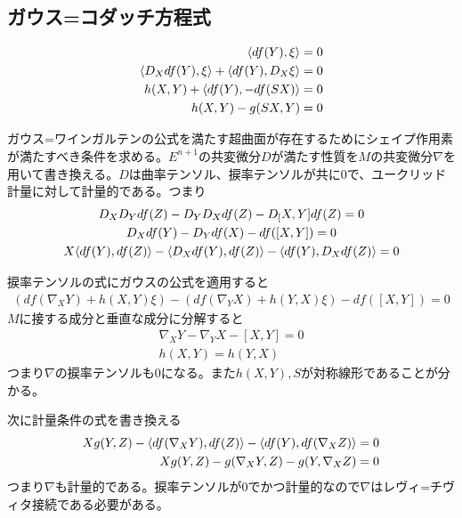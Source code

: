    \subsection{ガウス=コダッチ方程式}

        \begin{align*}
            \langle df(Y), \xi\rangle = 0\\
            \langle D_Xdf(Y), \xi\rangle + \langle df(Y), D_X\xi\rangle = 0\\
            h(X, Y) + \langle df(Y), -df(SX)\rangle = 0\\
            h(X, Y) - g(SX, Y) = 0\\
        \end{align*}

        ガウス=ワインガルテンの公式を満たす超曲面が存在するためにシェイプ作用素が満たすべき条件を求める。$E^{n+1}$の共変微分$D$が満たす性質を$M$の共変微分$\nabla$を用いて書き換える。$D$は曲率テンソル、捩率テンソルが共に0で、ユークリッド計量に対して計量的である。つまり
        \begin{gather*}
            D_XD_Ydf(Z) - D_YD_Xdf(Z) - D_[X, Y]df(Z) = 0\\
            D_Xdf(Y) - D_Ydf(X) - df([X, Y]) = 0\\
            X\langle df(Y), df(Z)\rangle - \langle D_Xdf(Y), df(Z)\rangle - \langle df(Y), D_Xdf(Z)\rangle = 0\\
        \end{gather*}

        捩率テンソルの式にガウスの公式を適用すると
        \begin{align*}
            (df(\nabla_XY) + h(X, Y)\xi) - (df(\nabla_YX) + h(Y, X)\xi) - df([X, Y]) = 0
        \end{align*}
        $M$に接する成分と垂直な成分に分解すると
        \begin{gather*}
            \nabla_XY - \nabla_YX - [X, Y] = 0\\
            h(X, Y) = h(Y, X)
        \end{gather*}
        つまり$\nabla$の捩率テンソルも0になる。また$h(X, Y), S$が対称線形であることが分かる。

        次に計量条件の式を書き換える
        \begin{align*}
            Xg(Y, Z) - \langle df(\nabla_XY), df(Z)\rangle - \langle df(Y), df(\nabla_XZ)\rangle &= 0\\
            Xg(Y, Z) - g(\nabla_XY, Z) - g(Y, \nabla_XZ) &= 0\\
        \end{align*}
        つまり$\nabla$も計量的である。捩率テンソルが0でかつ計量的なので$\nabla$はレヴィ=チヴィタ接続である必要がある。

